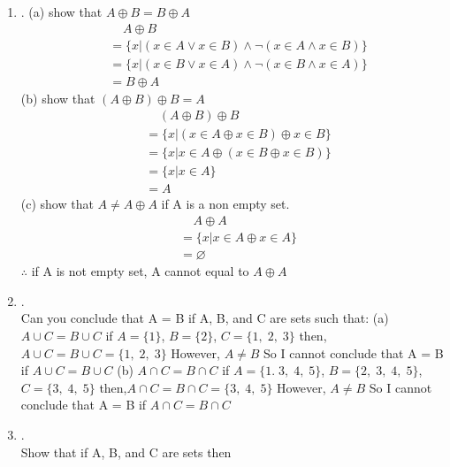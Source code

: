 \documentclass{article}
\theoremstyle{definition}
\theoremstyle{plain}
\begin{document}
\begin {enumerate}[itemindent=30pt,label=\bf Exercise {\arabic*}:]
\begin{align*}
	&=\{x|(x \in A \land (x \notin A \lor x \notin B)) \lor (x \in B \land (x \notin A \lor x \notin B))\}\\
	&=\{x|(x \in A \land x \notin B) \lor (x \in B \land x \notin A )\}\\
	&=(A - B) \cup (B - A)
\end{align*} 
\newpage
\item .
\subitem (a) show that $A \oplus B = B \oplus A$
\begin{align*}
	&\;\;\;\;A \oplus B\\
	&=\{x|(x \in A \lor x \in B) \land \neg (x \in A \land x \in B)\}\\
	&=\{x|(x \in B \lor x \in A) \land \neg (x \in B \land x \in A)\}\\
	&=B \oplus A	
\end{align*}
\subitem (b) show that $(A \oplus B) \oplus B = A$
\begin{align*}
	&\;\;\;\;(A \oplus B) \oplus B\\
	&=\{x|(x \in A \oplus x \in B) \oplus x \in B\}\\
	&=\{x| x \in A \oplus (x \in B \oplus x \in B) \}\\
	&=\{x|x \in A\}\\
	&=A
\end{align*}
\subitem (c) show that $A \neq A \oplus A$ if A is a non empty set.
\begin{align*}
	&\;\;\;\;A \oplus A\\
	&=\{x| x \in A \oplus x \in A\}\\
	&=\varnothing
\end{align*}
\subitem \qquad\qquad\qquad$\therefore$ if A is not empty set, A cannot equal to $A \oplus A$
\item .\\
Can you conclude that A = B if A, B, and C are sets such that:
\subitem (a) $A \cup C = B \cup C $
\subitem \qquad if $A = \{1\}$, $B =\{2\}$, $C=\{1,\;2,\;3\}$
\subitem \qquad then,$A \cup C = B \cup C = \{1,\;2,\;3\} $
\subitem \qquad However, $A \neq B$
\subitem \qquad So I cannot conclude that A = B if $A \cup C = B \cup C $
\subitem (b) $A \cap C = B \cap C $
\subitem \qquad if $A = \{1.\;3,\;4,\;5\}$, $B =\{2,\;3,\;4,\;5\}$, $C=\{3,\;4,\;5\}$
\subitem \qquad then,$A \cap C = B \cap C = \{3,\;4,\;5\} $
\subitem \qquad However, $A \neq B$
\subitem \qquad So I cannot conclude that A = B if $A \cap C = B \cap C $
\newpage
\item .\\
Show that if A, B, and C are sets then

\end{enumerate}
\end{document}
